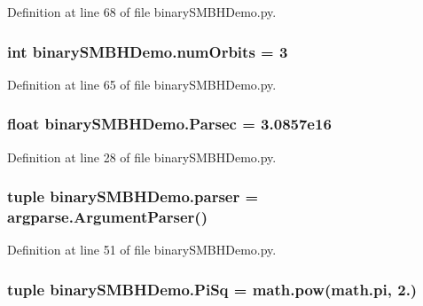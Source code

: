 Definition at line 68 of file binary\-S\-M\-B\-H\-Demo.\-py.

\hypertarget{namespacebinary_s_m_b_h_demo_a6fd042d16c07f82a55f4f905c563c0d9}{
\subsubsection[{num\-Orbits}]{\setlength{\rightskip}{0pt plus 5cm}int binary\-S\-M\-B\-H\-Demo.\-num\-Orbits = 3}}\label{namespacebinary_s_m_b_h_demo_a6fd042d16c07f82a55f4f905c563c0d9}


Definition at line 65 of file binary\-S\-M\-B\-H\-Demo.\-py.

\hypertarget{namespacebinary_s_m_b_h_demo_a5d91723e60291fd221a8e96bbbf009c8}{
\subsubsection[{Parsec}]{\setlength{\rightskip}{0pt plus 5cm}float binary\-S\-M\-B\-H\-Demo.\-Parsec = 3.\-0857e16}}\label{namespacebinary_s_m_b_h_demo_a5d91723e60291fd221a8e96bbbf009c8}


Definition at line 28 of file binary\-S\-M\-B\-H\-Demo.\-py.

\hypertarget{namespacebinary_s_m_b_h_demo_aebac506937847b8a824a3f705785ff3c}{
\subsubsection[{parser}]{\setlength{\rightskip}{0pt plus 5cm}tuple binary\-S\-M\-B\-H\-Demo.\-parser = argparse.\-Argument\-Parser()}}\label{namespacebinary_s_m_b_h_demo_aebac506937847b8a824a3f705785ff3c}


Definition at line 51 of file binary\-S\-M\-B\-H\-Demo.\-py.

\hypertarget{namespacebinary_s_m_b_h_demo_af37ef2efc0cd6b0b69f996394f5ddf18}{
\subsubsection[{Pi\-Sq}]{\setlength{\rightskip}{0pt plus 5cm}tuple binary\-S\-M\-B\-H\-Demo.\-Pi\-Sq = math.\-pow({\bf math.\-pi}, 2.)}}\label{namespacebinary_s_m_b_h_demo_af37ef2efc0cd6b0b69f996394f5ddf18}


